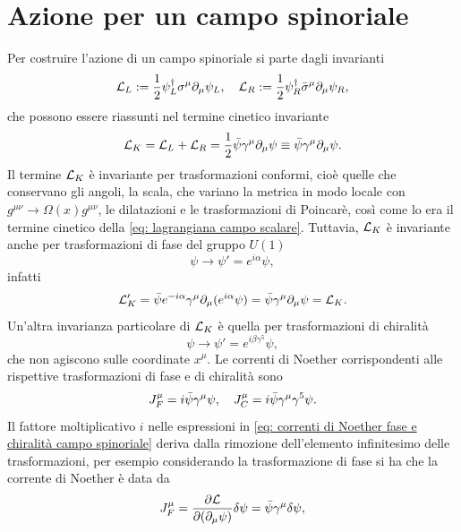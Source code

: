 \section{Azione per un campo spinoriale}
Per costruire l'azione di un campo spinoriale si parte dagli invarianti
\begin{equation}
    \mathcal{L}_L := \frac{1}{2}\psi_L^\dagger\sigma^\mu\partial_\mu\psi_L,\quad\mathcal{L}_R := \frac{1}{2}\psi_R^\dagger\bar{\sigma}^\mu\partial_\mu\psi_R,
\end{equation}
che possono essere riassunti nel termine cinetico invariante
\begin{equation}
    \mathcal{L}_K = \mathcal{L}_L + \mathcal{L}_R = \frac{1}{2}\bar{\psi}\gamma^\mu\partial_\mu\psi \equiv \bar{\psi}\gamma^\mu\partial_\mu\psi.
\end{equation}
Il termine $\mathcal{L}_K$ è invariante per trasformazioni conformi, cioè quelle che conservano gli angoli, la scala, che variano la metrica in modo locale con $g^{\mu\nu}\to\Omega(x)g^{\mu\nu}$, le dilatazioni e le trasformazioni di Poincarè, così come lo era il termine cinetico della \eqref{eq: lagrangiana campo scalare}. Tuttavia, $\mathcal{L}_K$ è invariante anche per trasformazioni di fase del gruppo $U(1)$
\begin{equation}
    \psi\to\psi' = e^{i\alpha}\psi,
\end{equation}
infatti
\begin{equation}
    \mathcal{L}'_K = \bar{\psi} e^{-i\alpha}\gamma^\mu\partial_\mu(e^{i\alpha}\psi) = \bar{\psi}\gamma^\mu\partial_\mu\psi = \mathcal{L}_K.
\end{equation}
Un'altra invarianza particolare di $\mathcal{L}_K$ è quella per trasformazioni di chiralità
\begin{equation}
    \psi\to\psi' = e^{i\beta\gamma^5}\psi,
\end{equation}
che non agiscono sulle coordinate $x^\mu$. Le correnti di Noether corrispondenti alle rispettive trasformazioni di fase e di chiralità sono
\begin{equation}
\label{eq: correnti di Noether fase e chiralità campo spinoriale}
    J^\mu_F = i\bar{\psi}\gamma^\mu\psi,\quad J^\mu_C = i\bar{\psi}\gamma^\mu\gamma^5\psi.
\end{equation}
Il fattore moltiplicativo $i$ nelle espressioni in \eqref{eq: correnti di Noether fase e chiralità campo spinoriale} deriva dalla rimozione dell'elemento infinitesimo delle trasformazioni, per esempio considerando la trasformazione di fase si ha che la corrente di Noether è data da
\begin{equation}
    J^\mu_F = \frac{\partial \mathcal{L}}{\partial(\partial_\mu\psi)}\delta\psi = \bar{\psi}\gamma^\mu\delta\psi,
\end{equation}
